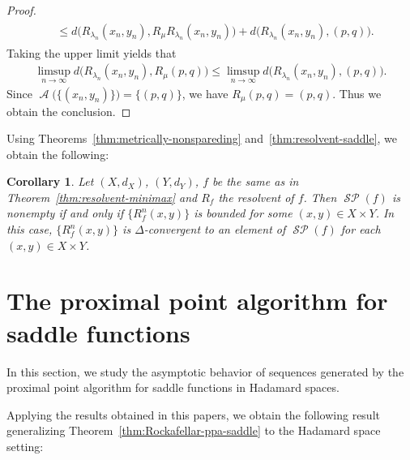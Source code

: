 \documentclass[draft]{amsart}
\numberwithin{equation}{section}
\DeclareMathOperator{\AC}{\mathcal{A}}
\DeclareMathOperator{\Saddle}{\mathcal{SP}}
\theoremstyle{plain}
\newtheorem{corollary}[theorem]{Corollary}
\theoremstyle{definition}
\theoremstyle{remark}
\begin{document}
\begin{proof}
\begin{align}
\begin{split}
 &\leq 
  d\bigl(
  R_{\lambda_n}(x_{n},y_{n}), R_{\mu}R_{\lambda_n}(x_{n},y_{n})
  \bigr) 
 + d\bigl(
  R_{\lambda_n}(x_{n},y_{n}), (p,q)
  \bigr).   
 \end{split}
 \end{align}
 Taking the upper limit yields that 
 \begin{align}
  \limsup_{n\to \infty} d\bigl(
  R_{\lambda_n}(x_{n},y_{n}), R_{\mu}(p,q)
  \bigr) 
  \leq 
   \limsup_{n\to \infty} d\bigl(
  R_{\lambda_n}(x_{n},y_{n}), (p,q)
  \bigr). 
 \end{align}
 Since $\AC\bigl(\{(x_n,y_n)\}\bigr)=\{(p,q)\}$, we have 
 $R_{\mu}(p,q)=(p,q)$. Thus we obtain the conclusion. 
\fi
\end{proof}

Using Theorems~\ref{thm:metrically-nonspareding} 
and~\ref{thm:resolvent-saddle}, we obtain the following: 

\begin{corollary}
 Let $(X,d_X)$, $(Y,d_Y)$, $f$ be the same as in 
 Theorem~\ref{thm:resolvent-minimax} and 
 $R_f$ the resolvent of $f$. 
 Then $\Saddle (f)$ is nonempty if and only if 
 $\{R_f^n(x,y)\}$ is bounded for some $(x,y)\in X\times Y$. 
 In this case, $\{R_f^n(x,y)\}$ is $\Delta$-convergent to 
 an element of $\Saddle (f)$ 
 for each $(x,y)\in X\times Y$.  
\end{corollary}

\section{The proximal point algorithm for saddle functions}\label{sec:ppa}

In this section, we study the asymptotic behavior of 
sequences generated by the proximal point algorithm 
for saddle functions in Hadamard spaces. 

Applying the results obtained in this papers, we obtain 
the following result generalizing Theorem~\ref{thm:Rockafellar-ppa-saddle} 
to the Hadamard space setting: 
\end{document}
